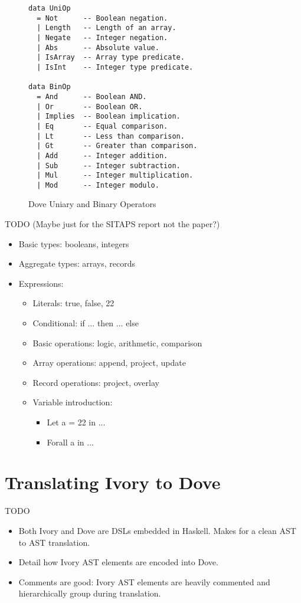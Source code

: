 \documentclass{article}
\begin{document}
\begin{figure}
  \caption{Dove Uniary and Binary Operators}
  \label{doveOperators}
  \begin{lstlisting}
data UniOp
  = Not      -- Boolean negation.
  | Length   -- Length of an array.
  | Negate   -- Integer negation.
  | Abs      -- Absolute value.
  | IsArray  -- Array type predicate.
  | IsInt    -- Integer type predicate.

data BinOp
  = And      -- Boolean AND.
  | Or       -- Boolean OR.
  | Implies  -- Boolean implication.
  | Eq       -- Equal comparison.
  | Lt       -- Less than comparison.
  | Gt       -- Greater than comparison.
  | Add      -- Integer addition.
  | Sub      -- Integer subtraction.
  | Mul      -- Integer multiplication.
  | Mod      -- Integer modulo.
  \end{lstlisting}
\end{figure}

TODO
(Maybe just for the SITAPS report not the paper?)
\begin{itemize}
  \item Basic types: booleans, integers
  \item Aggregate types: arrays, records
  \item Expressions:
  \begin{itemize}
    \item Literals: true, false, 22
    \item Conditional: if ... then ... else
    \item Basic operations: logic, arithmetic, comparison
    \item Array operations: append, project, update
    \item Record operations: project, overlay
    \item Variable introduction:
    \begin{itemize}
      \item Let a = 22 in ...
      \item Forall a in ...
    \end{itemize}
  \end{itemize}
\end{itemize}

\section{Translating Ivory to Dove}
TODO
\begin{itemize}
  \item Both Ivory and Dove are DSLs embedded in Haskell.  Makes for a clean AST to AST translation.
  \item Detail how Ivory AST elements are encoded into Dove.
  \item Comments are good: Ivory AST elements are heavily commented and hierarchically group during translation.
\end{itemize}
\end{document}
